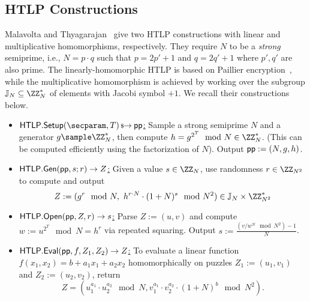 
\subsection{HTLP Constructions}\label{app:htlp_constructions}

Malavolta and Thyagarajan~\cite{C:MalThy19} give two HTLP constructions with linear and multiplicative homomorphisms, respectively. They require $N$ to be a \emph{strong} semiprime, i.e., $N = p \cdot q$ such that $p = 2p' + 1$ and $q = 2q' + 1$ where $p', q'$ are also prime. The linearly-homomorphic HTLP is based on Paillier encryption~\cite{C:Paillier99}, while the multiplicative homomorphism is achieved by working over the subgroup $\JJ_N \subseteq \ZZ_N^*$ of elements with Jacobi symbol $+1$. 
We recall their constructions below.

    \begin{construction}\label{con:paillierHTLP}
    \hfill
    \begin{itemize}
        \item \underline{$\htlp.\Setup(\secparam, \Ttime) \randout \pparam$:} Sample a strong semiprime $N$ and a generator $g \sample \ZZ_N^*$, then compute $h = g^{2^\Ttime} \mod{N} \in \ZZ_N^*$. (This can be computed efficiently using the factorization of $N$). Output $\mathsf{pp} := (N, g, h)$.
        \item \underline{$\mathsf{HTLP}.{\sf Gen}(\mathsf{pp}, s; r) \rightarrow Z$:} Given a value $s \in \ZZ_N$, use randomness $r \in \ZZ_{N^2}$ to compute and output
            $$Z := (g^r \mod{N},\ h^{r \cdot N} \cdot (1+N)^s \mod{N^2}) \in \JJ_N \times \ZZ_{N^2}^*$$
        \item \underline{$\mathsf{HTLP}.\mathsf{Open}(\mathsf{pp}, Z, r) \rightarrow s$:} Parse $Z := (u,v)$ and compute $w := u^{2^T} \mod{N} \allowbreak= h^r$ via repeated squaring. Output $s := \frac{(v/w^N \mod{N^2})- 1}{N}$.
        \item \underline{$\mathsf{HTLP}.{\sf Eval}(\mathsf{pp}, f, Z_1, Z_2) \rightarrow Z$:} To evaluate a linear function $f(x_1, x_2) = b + a_1 x_1 + a_2 x_2$ homomorphically on puzzles $Z_1 := (u_1, v_1)$ and $Z_2 := (u_2, v_2)$, return
        $$Z = (u_1^{a_1} \cdot u_2^{a_2} \mod{N}, v_1^{a_1} \cdot v_2^{a_2} \cdot (1+N)^b \mod{N^2}).$$
    \end{itemize}
    \end{construction}


